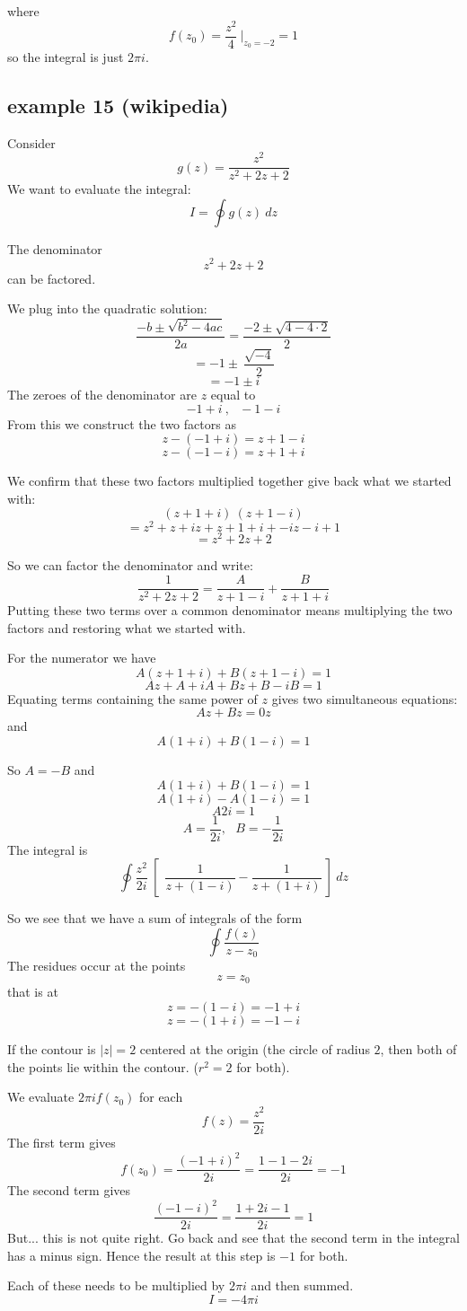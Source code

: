 \documentclass[11pt, oneside]{article}
\begin{document}
where 
\[ f(z_0) = \frac{z^2}{4}  \ \bigg |_{z_0 = -2} = 1 \]
so the integral is just $2 \pi i$.

\subsection*{example 15 (wikipedia)}

\label{sec:ex15PF}

Consider
\[ g(z) = \frac{z^2}{z^2 + 2z + 2} \]
We want to evaluate the integral:
\[ I = \oint g(z) \ dz \]

The denominator
\[ z^2 + 2z + 2 \]
can be factored.

We plug into the quadratic solution:
\[ \frac{-b \pm \sqrt{b^2 - 4ac}}{2a} =  \frac{-2 \pm \sqrt{4 - 4 \cdot 2}}{2} \]
\[ = -1 \pm \  \frac{\sqrt{-4}}{2} \]
\[ = -1 \pm i \]
The zeroes of the denominator are $z$ equal to 
\[ - 1 + i \ , \ \ \ - 1 - i \]
From this we construct the two factors as
\[ z - (- 1 + i) = z + 1 - i \]
\[ z - (-1 - i) = z + 1 + i \]

We confirm that these two factors multiplied together give back what we started with:
\[ (z + 1 + i) \ (z + 1 - i) \]
\[ = z^2 + z + iz + z + 1 + i + -iz - i + 1 \] 
\[ = z^2 + 2z + 2 \]

So we can factor the denominator and write:
\[ \frac{1}{z^2 + 2z + 2} = \frac{A}{z + 1 - i} + \frac{B}{z + 1 + i}  \]
Putting these two terms over a common denominator means multiplying the two factors and restoring what we started with.

For the numerator we have
\[ A(z + 1 + i) + B(z + 1 - i) = 1 \]
\[ Az + A + iA + Bz + B - iB = 1 \]
Equating terms containing the same power of $z$ gives two simultaneous equations:
\[ Az + Bz = 0z \]
and
\[ A(1 + i) + B(1 - i) = 1 \]

So $A = -B$ and
\[ A(1 + i) + B(1 - i) = 1 \]
\[ A (1 + i) - A(1 - i) = 1 \]
\[ A 2i = 1 \]
\[ A = \frac{1}{2i}, \ \ \ B = -\frac{1}{2i} \]
The integral is
\[ \oint \frac{z^2}{2i} \ [ \ \ \frac{1}{z + (1 - i)} -  \frac{1}{z + (1 + i)} \ ] \ dz \]

So we see that we have a sum of integrals of the form
\[ \oint \frac{f(z)}{z - z_0} \]
The residues occur at the points
\[ z = z_0 \]
that is at 
\[ z = - (1 - i) = -1 + i \]
\[ z = - (1 + i) = -1 - i \]

If the contour is $|z| = 2$ centered at the origin (the circle of radius $2$, then both of the points lie within the contour.  ($ r^2 = 2$ for both).

We evaluate $2 \pi i f(z_0)$ for each
\[ f(z) = \frac{z^2}{2i} \]
The first term gives
\[ f(z_0) = \frac{(-1 + i)^2}{2i} =  \frac{1 - 1 - 2i}{2i} = -1 \]
The second term gives 
\[ \frac{(-1 -i)^2}{2i} = \frac{1 + 2i - 1}{2i} = 1 \]
But...  this is not quite right.  Go back and see that the second term in the integral has a minus sign.  Hence the result at this step is $-1$ for both.

Each of these needs to be multiplied by $2 \pi i$ and then summed.
\[ I = -4 \pi i \]
\end{document}
